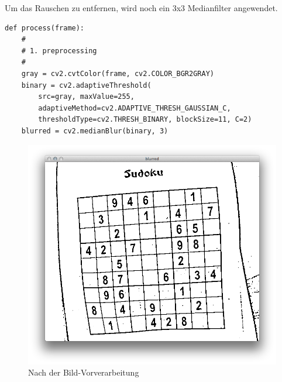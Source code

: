 Um das Rauschen zu entfernen, wird noch ein 3x3 Medianfilter angewendet.

\begin{lstlisting}
def process(frame):
    #
    # 1. preprocessing
    #
    gray = cv2.cvtColor(frame, cv2.COLOR_BGR2GRAY)
    binary = cv2.adaptiveThreshold(
        src=gray, maxValue=255,
        adaptiveMethod=cv2.ADAPTIVE_THRESH_GAUSSIAN_C,
        thresholdType=cv2.THRESH_BINARY, blockSize=11, C=2)
    blurred = cv2.medianBlur(binary, 3)
\end{lstlisting}

\begin{figure}[H]
\end{figure}
%
\begin{figure}[H]
    \centering
    \includegraphics[width=.5\textwidth]{Abbildungen/median}
    \caption{Nach der Bild-Vorverarbeitung}
\end{figure}

